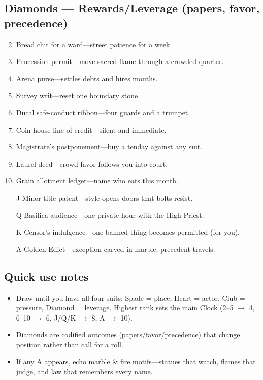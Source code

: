 \subsection*{Diamonds --- Rewards/Leverage (papers, favor, precedence)}
\label{sec:ecktoria-rewards}
\begin{enumerate}
\setcounter{enumi}{1}
\item Bread chit for a ward---street patience for a week.
\item Procession permit---move sacred flame through a crowded quarter.
\item Arena purse---settles debts and hires mouths.
\item Survey writ---reset one boundary stone.
\item Ducal safe-conduct ribbon---four guards and a trumpet.
\item Coin-house line of credit---silent and immediate.
\item Magistrate's postponement---buy a tenday against any suit.
\item Laurel-deed---crowd favor follows you into court.
\item Grain allotment ledger---name who eats this month.
\item[J] Minor title patent---style opens doors that bolts resist.
\item[Q] Basilica audience---one private hour with the High Priest.
\item[K] Censor's indulgence---one banned thing becomes permitted (for you).
\item[A] Golden Edict---exception carved in marble; precedent travels.
\end{enumerate}

\subsection*{Quick use notes}
\label{sec:ecktoria-quick-use}
\begin{itemize}
\item Draw until you have all four suits: Spade = place, Heart = actor, Club = pressure, Diamond = leverage. Highest rank sets the main Clock (2--5 $\rightarrow$ 4, 6--10 $\rightarrow$ 6, J/Q/K $\rightarrow$ 8, A $\rightarrow$ 10).
\item Diamonds are codified outcomes (papers/favor/precedence) that change position rather than call for a roll.
\item If any A appears, echo marble \& fire motifs---statues that watch, flames that judge, and law that remembers every name.
\end{itemize}

